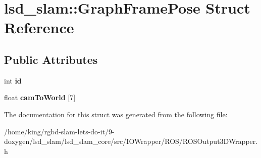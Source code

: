 \hypertarget{structlsd__slam_1_1_graph_frame_pose}{\section{lsd\-\_\-slam\-:\-:Graph\-Frame\-Pose Struct Reference}
\label{structlsd__slam_1_1_graph_frame_pose}
}
\subsection*{Public Attributes}
\begin{DoxyCompactItemize}
\item 
\hypertarget{structlsd__slam_1_1_graph_frame_pose_ac7583a93a023e84b74b6e90d1a03195d}{int {\bfseries id}}\label{structlsd__slam_1_1_graph_frame_pose_ac7583a93a023e84b74b6e90d1a03195d}

\item 
\hypertarget{structlsd__slam_1_1_graph_frame_pose_ab65bdda1c79aaa602d5fb97df8af2697}{float {\bfseries cam\-To\-World} \mbox{[}7\mbox{]}}\label{structlsd__slam_1_1_graph_frame_pose_ab65bdda1c79aaa602d5fb97df8af2697}

\end{DoxyCompactItemize}


The documentation for this struct was generated from the following file\-:\begin{DoxyCompactItemize}
\item 
/home/king/rgbd-\/slam-\/lets-\/do-\/it/9-\/doxygen/lsd\-\_\-slam/lsd\-\_\-slam\-\_\-core/src/\-I\-O\-Wrapper/\-R\-O\-S/R\-O\-S\-Output3\-D\-Wrapper.\-h\end{DoxyCompactItemize}
